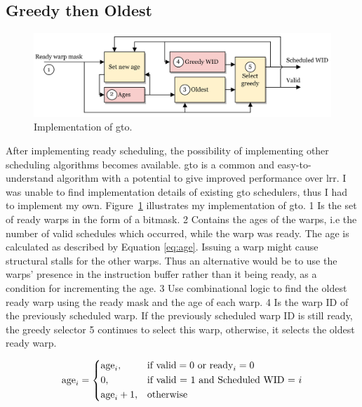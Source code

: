 \newpage
\subsection{Greedy then Oldest}

\begin{figure}
    \centering
    \includegraphics[width=\textwidth]{figures/gto_numbers.png}
    \caption{Implementation of \acrfull{gto}.}
    \label{fig:gto_impl}
\end{figure}

After implementing ready scheduling, the possibility of implementing other scheduling algorithms becomes available. \Acrfull{gto} is a common and easy-to-understand algorithm with a potential to give improved performance over \acrfull{lrr}. I was unable to find implementation details of existing \acrshort{gto} schedulers, thus I had to implement my own. Figure~\ref{fig:gto_impl} illustrates my implementation of \acrshort{gto}. \textcircled{\small{1}} Is the set of ready warps in the form of a bitmask. \textcircled{\small{2}} Contains the ages of the warps, i.e the number of valid schedules which occurred, while the warp was ready. The age is calculated as described by Equation \ref{eq:age}. Issuing a warp might cause structural stalls for the other warps. Thus an alternative would be to use the warps' presence in the instruction buffer rather than it being ready, as a condition for incrementing the age. \textcircled{\small{3}} Use combinational logic to find the oldest ready warp using the ready mask and the age of each warp. \textcircled{\small{4}} Is the warp ID of the previously scheduled warp. If the previously scheduled warp ID is still ready, the greedy selector \textcircled{\small{5}} continues to select this warp, otherwise, it selects the oldest ready warp.

\begin{equation} \label{eq:age}
    \text{age}_i = 
    \begin{dcases}
            \text{age}_i, & \text{if } \text{valid} = 0 \text{ or ready}_i = 0  \\
            0, & \text{if } \text{valid = 1 and Scheduled WID = } i \\
            \text{age}_i + 1, & \text{otherwise}
    \end{dcases}
\end{equation}

